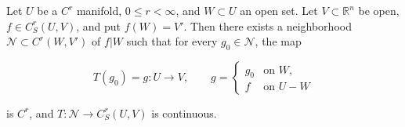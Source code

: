 Let $U$ be a $C^r$ manifold, $0 \leqslant r < \infty$, and $W \subset U$ an open set. Let $V \subset \mathbb{R}^n$ be open, $f \in C^r_S(U,V)$, and put $f(W) = V'$. Then there exists a neighborhood $\mathcal{N} \subset C^r(W,V')$ of $f|W$ such that for every $g_0 \in \mathcal{N}$, the map

$$T(g_0) = g \colon U \to V, \qquad g = \begin{cases} g_0 & \text{on } W, \\ f & \text{on } U - W \end{cases}$$

is $C^r$, and $T \colon \mathcal{N} \to C^r_S(U,V)$ is continuous.
